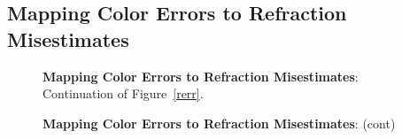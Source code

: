 \documentclass[DM,toc]{lsstdoc}
\begin{document}
\subsection{Mapping Color Errors to Refraction Misestimates \label{appx:rerr}}
\begin{figure}[h]
    \centering
    \caption[]{\textbf{Mapping Color Errors to Refraction Misestimates}:  Continuation of Figure~\ref{rerr}.}
    \label{rerr2}
\end{figure}
\begin{figure}
    \ContinuedFloat
    \centering
    \caption[]{\textbf{Mapping Color Errors to Refraction Misestimates}: (cont)}
    \label{rerr2}
\end{figure}
\end{document}
